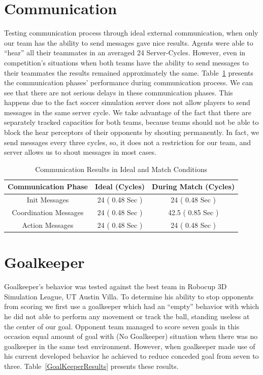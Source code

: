 \section{Communication}
Testing communication process through ideal external communication, when only our team has the ability to send messages gave nice results. Agents were able to ``hear'' all their teammates in an averaged 24 Server-Cycles. However, even in competition's situations when both teams have the ability to send messages to their teammates the results remained approximately the same. Table~\ref{CommunicationResults} presents the communication phases' performance during communication process. We can see that there are not serious delays in these communication phases. This happens due to the fact soccer simulation server does not allow players to send messages in the same server cycle. We take advantage of the fact that there are separately tracked capacities for both teams, because teams should not be able to block the hear perceptors of their opponents by shouting permanently. In fact, we send  messages every three cycles, so, it does not a restriction for our team, and server allows us to shout messages in most cases.

\begin{table}[h!]
\begin{center}
    \begin{tabular}{ccc}
    \textbf{Communication Phase} 	& \textbf{Ideal (Cycles)}			& \textbf{During Match (Cycles)} \\
    \midrule
    Init Messages 					& 24  ( 0.48 Sec ) 			& 24 	( 0.48 Sec )		\\
    Coordination Messages			& 24  ( 0.48 Sec )			& 42.5  ( 0.85 Sec )		\\
    Action Messages 				    & 24  ( 0.48 Sec )			& 24 ( 0.48 Sec )	 		\\
    \end{tabular}
\end{center}
\label{CommunicationResults}
\caption{Communication Results in Ideal and Match Conditions}
\end{table}



\section{Goalkeeper}
Goalkeeper's behavior was tested against the best team in Robocup 3D Simulation League, UT Austin Villa. To determine his ability to stop opponents from scoring we first use a goalkeeper which had an ``empty'' behavior with which he did not able to perform any movement or track the ball, standing useless at the center of our goal. Opponent team managed to score seven goals in this occasion equal amount of goal with (No Goalkeeper) situation when there was no goalkeeper in the same test environment. However, when goalkeeper made use of his current developed behavior he achieved to reduce conceded goal from seven to three. Table~\ref{GoalKeeperResults} presents these results.



